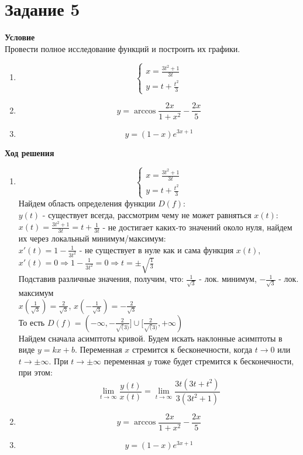 \newpage
\section{Задание 5} 
{\bf\large Условие} \\
Провести полное исследование функций и построить их графики.
\begin{enumerate}
    \item 
    \begin{equation*}
        \begin{cases}
            x = \frac{3t^2 +1}{3t} \\
            y = t + \frac{t^2}{3}
        \end{cases}
    \end{equation*}
    \item 
    \[
        y = \arccos{\frac{2x}{1+x^2}} - \frac{2x}{5}
    \]
    \item 
    \[
        y = (1-x)e^{3x+1}
    \]
\end{enumerate}
{\bf\large Ход решения} \\
\begin{enumerate}
    \item 
    \begin{equation*}
        \begin{cases}
            x = \frac{3t^2 +1}{3t} \\
            y = t + \frac{t^2}{3}
        \end{cases}
    \end{equation*}
    Найдем область определения функции $D(f)$: \\
    $y(t)$ - существует всегда, рассмотрим чему не может равняться $x(t)$:\\
    $x(t) = \frac{3t^2 +1}{3t} = t + \frac{1}{3t}$ - не достигает каких-то значений около нуля, найдем их через локальный минимум/максимум: \\
    $x'(t) = 1 - \frac{1}{3t^2}$ - не существует в нуле как и сама функция $x(t)$,
    $x'(t) = 0 \Rightarrow 1 - \frac{1}{3t^2} = 0 \Rightarrow t = \pm \sqrt{\frac{1}{3}}$ \\
    Подставив различные значения, получим, что: $\frac{1}{\sqrt{3}}$ - лок. минимум, $-\frac{1}{\sqrt{3}}$ - лок. максимум \\
    $x(\frac{1}{\sqrt{3}}) = \frac{2}{\sqrt{3}}$, $x(-\frac{1}{\sqrt{3}}) = -\frac{2}{\sqrt{3}}$ \\
    То есть $D(f) = (-\infty,-\frac{2}{\sqrt(3)}] \cup [\frac{2}{\sqrt(3)},+\infty)$ \\
    Найдем сначала асимптоты кривой. Будем искать наклонные асимптоты в виде $y = kx + b$. Переменная $x$ стремится к бесконечности, когда $t\rightarrow 0$ или $t\rightarrow \pm \infty$. 
    При $t \rightarrow \pm \infty$ переменная $y$ тоже будет стремится к бесконечности, при этом: \\
    \[
        \lim_{t\rightarrow \infty }{\frac{y(t)}{x(t)}} = \lim_{t\rightarrow \infty }{\frac{3t(3t+t^2)}{3(3t^2+1)}}
    \] 
    \item 
    \[
        y = \arccos{\frac{2x}{1+x^2}} - \frac{2x}{5}
    \]
    \item 
    \[
        y = (1-x)e^{3x+1}
    \]
\end{enumerate}